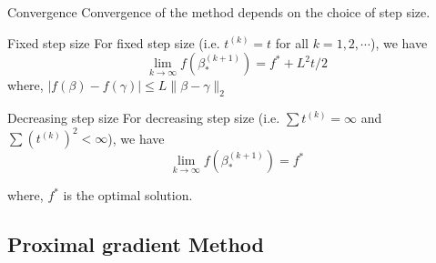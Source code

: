 \documentclass[tikz]{beamer}					%
\begin{document}
{
\begin{frame}{Convergence}
Convergence of the method depends on the choice of step size.
\begin{block}{Fixed step size}
    For fixed step size (i.e. $t^{(k)}=t$ for all $k=1,2,\cdots$), we have
    \begin{equation}
        \lim_{k\rightarrow \infty }f(\beta^{(k+1)}_{*}) = f^{*} + L^2t/2
    \end{equation}
    where, $|f(\beta) -f(\gamma)| \leq L\|\beta - \gamma\|_2$
\end{block}
\begin{block}{Decreasing step size}
    For decreasing step size (i.e. $\sum t^{(k)} = \infty$ and $\sum (t^{(k)})^2 <\infty$),
    we have
    \begin{equation}
        \lim_{k\rightarrow \infty }f(\beta^{(k+1)}_{*}) = f^{*}
    \end{equation}
\end{block}
where, $f^{*}$ is the optimal solution.
\end{frame}
}

\subsection{Proximal gradient Method}
\end{document}
